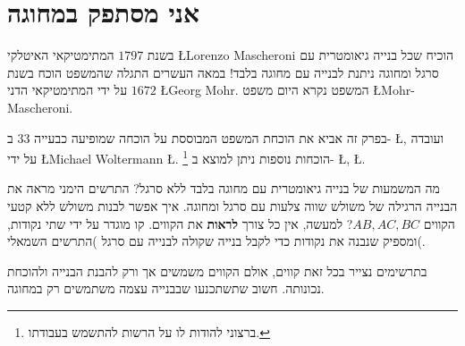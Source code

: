 



\chapter{אני מסתפק במחוגה}\label{c.compass-only}


בשנת
$1797$
המתימטיקאי האיטלקי
\L{Lorenzo Mascheroni}
הוכיח שכל בנייה גיאומטרית עם סרגל ומחוגה ניתנת לבנייה עם מחוגה בלבד! במאה העשרים התגלה שהמשפט הוכח בשנת
$1672$
על ידי המתימטיקאי הדני
\L{Georg Mohr}.
המשפט נקרא היום משפט
\L{Mohr-Mascheroni}.

בפרק זה אביא את הוכחת המשפט המבוססת על הוכחה שמופיעה כבעייה
$33$
ב-%
\L{\cite{dorrie1}},
ועובדה על ידי
\L{Michael Woltermann} \L{\cite{dorrie2}}.%
\footnote{%
ברצוני להודות לו על הרשות להתשמש בעבודתו.
}
הוכחות נוספות ניתן למוצא ב-%
\L{\cite{mm}}, \L{\cite{stopel}}.

מה המשמעות של בנייה גיאומטרית עם מחוגה בלבד ללא סרגל? התרשים הימני מראה את הבנייה הרגילה של משולש שווה צלעות עם סרגל ומחוגה. איך אפשר לבנות משולש ללא קטעי הקווים
$AB,AC,BC$?
למעשה, אין כל צורך
\textbf{לראות}
את הקווים. קו מוגדר על ידי שתי נקודות, ומספיק שנבנה את נקודות כדי לקבל בנייה שקולה לבנייה עם סרגל )התרשים השמאלי(.

\begin{center}
\end{center}
בתרשימים נצייר בכל זאת קווים, אולם הקווים משמשים אך ורק להבנת הבנייה ולהוכחת נכונותה. חשוב שתשתכנעו שבבנייה עצמה משתמשים רק במחוגה.


